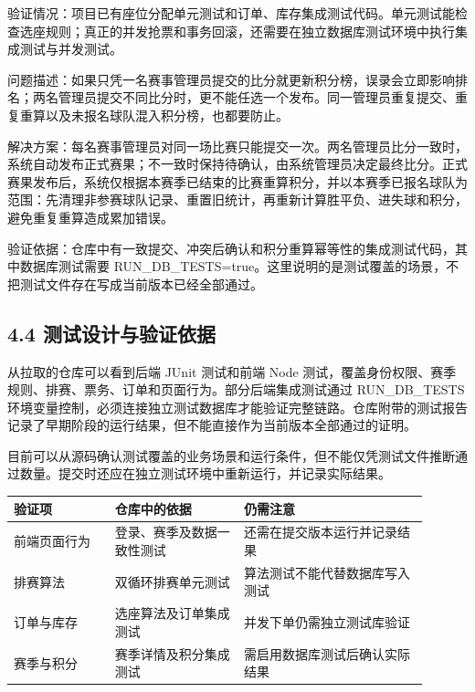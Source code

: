 \documentclass[UTF8,zihao=-4,a4paper]{ctexart}
\begin{document}
验证情况：项目已有座位分配单元测试和订单、库存集成测试代码。单元测试能检查选座规则；真正的并发抢票和事务回滚，还需要在独立数据库测试环境中执行集成测试与并发测试。


\par\medskip{}\par\nobreak\smallskip

问题描述：如果只凭一名赛事管理员提交的比分就更新积分榜，误录会立即影响排名；两名管理员提交不同比分时，更不能任选一个发布。同一管理员重复提交、重复重算以及未报名球队混入积分榜，也都要防止。


解决方案：每名赛事管理员对同一场比赛只能提交一次。两名管理员比分一致时，系统自动发布正式赛果；不一致时保持待确认，由系统管理员决定最终比分。正式赛果发布后，系统仅根据本赛季已结束的比赛重算积分，并以本赛季已报名球队为范围：先清理非参赛球队记录、重置旧统计，再重新计算胜平负、进失球和积分，避免重复重算造成累加错误。


验证依据：仓库中有一致提交、冲突后确认和积分重算幂等性的集成测试代码，其中数据库测试需要 RUN\_\allowbreak{}DB\_\allowbreak{}TESTS=true。这里说明的是测试覆盖的场景，不把测试文件存在写成当前版本已经全部通过。


\subsection*{4.4 测试设计与验证依据}

从拉取的仓库可以看到后端 JUnit 测试和前端 Node 测试，覆盖身份权限、赛季规则、排赛、票务、订单和页面行为。部分后端集成测试通过 RUN\_\allowbreak{}DB\_\allowbreak{}TESTS 环境变量控制，必须连接独立测试数据库才能验证完整链路。仓库附带的测试报告记录了早期阶段的运行结果，但不能直接作为当前版本全部通过的证明。


目前可以从源码确认测试覆盖的业务场景和运行条件，但不能仅凭测试文件推断通过数量。提交时还应在独立测试环境中重新运行，并记录实际结果。


\begin{longtable}{@{}>{\raggedright\arraybackslash}p{0.22\linewidth}>{\raggedright\arraybackslash}p{0.28\linewidth}>{\raggedright\arraybackslash}p{0.4\linewidth}@{}}\toprule

\textbf{验证项} & \textbf{仓库中的依据} & \textbf{仍需注意} \\\midrule

前端页面行为 & 登录、赛季及数据一致性测试 & 还需在提交版本运行并记录结果 \\

排赛算法 & 双循环排赛单元测试 & 算法测试不能代替数据库写入测试 \\

订单与库存 & 选座算法及订单集成测试 & 并发下单仍需独立测试库验证 \\

赛季与积分 & 赛季详情及积分集成测试 & 需启用数据库测试后确认实际结果 \\

\bottomrule\end{longtable}
\end{document}
